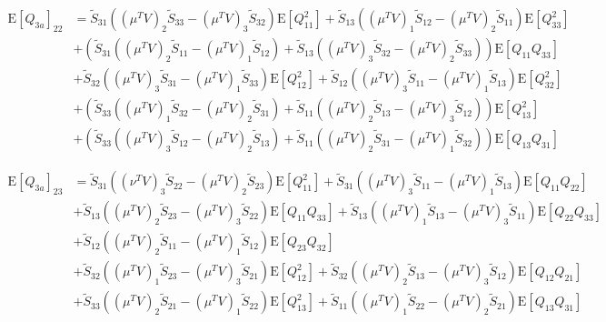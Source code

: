 \documentclass[10pt]{article}
\newcommand{\expect}[1]{\ensuremath{\mathrm{E}\left[ #1 \right]}}
\begin{document}
\begin{align}
	\expect{Q_{3a}}_{22} &= \tilde{S}_{31}\left( (\mu^TV)_2\tilde{S}_{33}-(\mu^TV)_3\tilde{S}_{32} \right)\expect{Q_{11}^2} + \tilde{S}_{13}\left( (\mu^TV)_1\tilde{S}_{12}-(\mu^TV)_2\tilde{S}_{11} \right)\expect{Q_{33}^2} \nonumber \\
	&+ \left( \tilde{S}_{31}\left( (\mu^TV)_2\tilde{S}_{11}-(\mu^TV)_1\tilde{S}_{12} \right) + \tilde{S}_{13}\left( (\mu^TV)_3\tilde{S}_{32}-(\mu^TV)_2\tilde{S}_{33} \right) \right)\expect{Q_{11}Q_{33}} \nonumber \\
	&+ \tilde{S}_{32}\left( (\mu^TV)_3\tilde{S}_{31}-(\mu^TV)_1\tilde{S}_{33} \right)\expect{Q_{12}^2} + \tilde{S}_{12}\left( (\mu^TV)_3\tilde{S}_{11}-(\mu^TV)_1\tilde{S}_{13} \right)\expect{Q_{32}^2} \nonumber \\
	&+ \left( \tilde{S}_{33}\left( (\mu^TV)_1\tilde{S}_{32}-(\mu^TV)_2\tilde{S}_{31} \right) + \tilde{S}_{11}\left( (\mu^TV)_2\tilde{S}_{13}-(\mu^TV)_3\tilde{S}_{12} \right) \right)\expect{Q_{13}^2} \nonumber \\
	&+ \left( \tilde{S}_{33}\left( (\mu^TV)_3\tilde{S}_{12}-(\mu^TV)_2\tilde{S}_{13} \right) + \tilde{S}_{11}\left( (\mu^TV)_2\tilde{S}_{31}-(\mu^TV)_1\tilde{S}_{32} \right) \right)\expect{Q_{13}Q_{31}}
\end{align}

\begin{align}
	\expect{Q_{3a}}_{23} &= \tilde{S}_{31}\left( (\nu^TV)_3\tilde{S}_{22}-(\mu^TV)_{2}\tilde{S}_{23} \right)\expect{Q_{11}^2} + \tilde{S}_{31}\left( (\mu^TV)_3\tilde{S}_{11}-(\mu^TV)_1\tilde{S}_{13} \right)\expect{Q_{11}Q_{22}} \nonumber \\
	&+ \tilde{S}_{13}\left( (\mu^TV)_2\tilde{S}_{23}-(\mu^TV)_3\tilde{S}_{22} \right)\expect{Q_{11}Q_{33}} + \tilde{S}_{13}\left( (\mu^TV)_1\tilde{S}_{13}-(\mu^TV)_3\tilde{S}_{11} \right)\expect{Q_{22}Q_{33}} \nonumber \\
	&+ \tilde{S}_{12}\left( (\mu^TV)_2\tilde{S}_{11}-(\mu^TV)_1\tilde{S}_{12} \right)\expect{Q_{23}Q_{32}} \nonumber \\
	&+ \tilde{S}_{32}\left( (\mu^TV)_1\tilde{S}_{23}-(\mu^TV)_3\tilde{S}_{21} \right)\expect{Q_{12}^2} + \tilde{S}_{32}\left( (\mu^TV)_2\tilde{S}_{13}-(\mu^TV)_3\tilde{S}_{12} \right)\expect{Q_{12}Q_{21}} \nonumber \\
	&+ \tilde{S}_{33}\left( (\mu^TV)_2\tilde{S}_{21}-(\mu^TV)_1\tilde{S}_{22} \right)\expect{Q_{13}^2} + \tilde{S}_{11}\left( (\mu^TV)_1\tilde{S}_{22}-(\mu^TV)_2\tilde{S}_{21} \right)\expect{Q_{13}Q_{31}}
\end{align}
\end{document}

